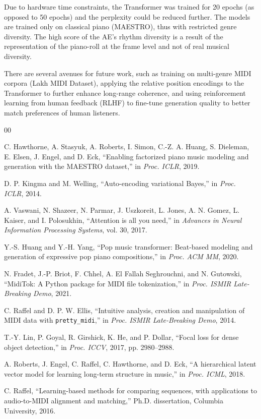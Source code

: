 \documentclass[conference]{IEEEtran}
\begin{document}
Due to hardware time constraints, the Transformer was trained for 20 epochs (as opposed to 50 epochs) and the perplexity could be reduced further. The models are trained only on classical piano (MAESTRO), thus with restricted genre diversity. The high score of the AE's rhythm diversity is a result of the representation of the piano-roll at the frame level and not of real musical diversity.

There are several avenues for future work, such as training on multi-genre MIDI corpora (Lakh MIDI Dataset), applying the relative position encodings to the Transformer to further enhance long-range coherence, and using reinforcement learning from human feedback (RLHF) to fine-tune generation quality to better match preferences of human listeners.


\begin{thebibliography}{00}

C. Hawthorne, A. Stasyuk, A. Roberts, I. Simon, C.-Z. A. Huang, S. Dieleman, E. Elsen, J. Engel, and D. Eck,
``Enabling factorized piano music modeling and generation with the MAESTRO dataset,''
in \textit{Proc. ICLR}, 2019.

D. P. Kingma and M. Welling,
``Auto-encoding variational Bayes,''
in \textit{Proc. ICLR}, 2014.

A. Vaswani, N. Shazeer, N. Parmar, J. Uszkoreit, L. Jones, A. N. Gomez, L. Kaiser, and I. Polosukhin,
``Attention is all you need,''
in \textit{Advances in Neural Information Processing Systems}, vol. 30, 2017.

Y.-S. Huang and Y.-H. Yang,
``Pop music transformer: Beat-based modeling and generation of expressive pop piano compositions,''
in \textit{Proc. ACM MM}, 2020.

N. Fradet, J.-P. Briot, F. Chhel, A. El Fallah Seghrouchni, and N. Gutowski,
``MidiTok: A Python package for MIDI file tokenization,''
in \textit{Proc. ISMIR Late-Breaking Demo}, 2021.

C. Raffel and D. P. W. Ellis,
``Intuitive analysis, creation and manipulation of MIDI data with \texttt{pretty\_midi},''
in \textit{Proc. ISMIR Late-Breaking Demo}, 2014.

T.-Y. Lin, P. Goyal, R. Girshick, K. He, and P. Dollar,
``Focal loss for dense object detection,''
in \textit{Proc. ICCV}, 2017, pp. 2980--2988.

A. Roberts, J. Engel, C. Raffel, C. Hawthorne, and D. Eck,
``A hierarchical latent vector model for learning long-term structure in music,''
in \textit{Proc. ICML}, 2018.

C. Raffel,
``Learning-based methods for comparing sequences, with applications to audio-to-MIDI alignment and matching,''
Ph.D. dissertation, Columbia University, 2016.

\end{thebibliography}
\end{document}
